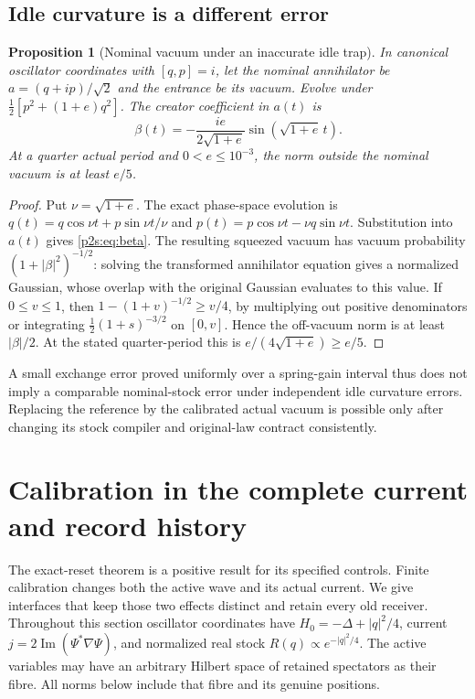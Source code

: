 \documentclass[11pt]{article}
\numberwithin{equation}{section}
\newtheorem{proposition}[theorem]{Proposition}
\theoremstyle{definition}
\theoremstyle{remark}
\begin{document}
\subsection{Idle curvature is a different error}
\begin{proposition}[Nominal vacuum under an inaccurate idle trap]
\label{p2s:prop:curvature}
In canonical oscillator coordinates with $[q,p]=i$, let the nominal
annihilator be $a=(q+ip)/\sqrt2$ and the entrance be its vacuum. Evolve
under $\tfrac12[p^2+(1+e)q^2]$. The creator coefficient in $a(t)$ is
\begin{equation}\label{p2s:eq:beta}
 \beta(t)=-\frac{ie}{2\sqrt{1+e}}
              \sin(\sqrt{1+e}\,t).
\end{equation}
At a quarter actual period and $0<e\leq10^{-3}$, the norm outside the
nominal vacuum is at least $e/5$.
\end{proposition}
\begin{proof}
Put $\nu=\sqrt{1+e}$. The exact phase-space evolution is
$q(t)=q\cos\nu t+p\sin\nu t/\nu$ and
$p(t)=p\cos\nu t-\nu q\sin\nu t$.
Substitution into $a(t)$ gives \eqref{p2s:eq:beta}. The resulting squeezed
vacuum has vacuum probability $(1+|\beta|^2)^{-1/2}$: solving the transformed
annihilator equation gives a normalized Gaussian, whose overlap with the
original Gaussian evaluates to this value. If $0\leq v\leq1$, then
$1-(1+v)^{-1/2}\geq v/4$, by multiplying out positive denominators or
integrating $\tfrac12(1+s)^{-3/2}$ on $[0,v]$. Hence the off-vacuum norm is
at least $|\beta|/2$. At the stated quarter-period this is
$e/(4\sqrt{1+e})\geq e/5$.
\end{proof}
A small exchange error proved uniformly over a spring-gain interval thus
does not imply a comparable nominal-stock error under independent idle
curvature errors. Replacing the reference by the calibrated actual vacuum
is possible only after changing its stock compiler and original-law
contract consistently.

\section{Calibration in the complete current and record history}
\label{p2s:sec:calibration}

The exact-reset theorem is a positive result for its specified controls.
Finite calibration changes both the active wave and its actual current.
We give interfaces that keep those two effects distinct and retain every
old receiver. Throughout this section oscillator coordinates have
$H_0=-\Delta+|q|^2/4$, current $j=2\operatorname{Im}(\Psi^*\nabla\Psi)$,
and normalized real stock $R(q)\propto e^{-|q|^2/4}$.
The active variables may have an arbitrary Hilbert space of retained
spectators as their fibre. All norms below include that fibre and its
genuine positions.
\end{document}
